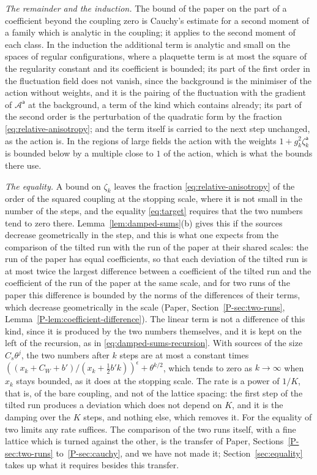 \documentclass[11pt]{preprint}
\numberwithin{equation}{section}
\theoremstyle{definition}
\theoremstyle{remark}
\theoremstyle{plain}
\begin{document}
\emph{The remainder and the induction.} The bound of the paper on the part of a coefficient beyond the coupling zero is Cauchy's estimate for a second moment of a family which is analytic in the coupling; it applies to the second moment of each class. In the induction the additional term is analytic and small on the spaces of regular configurations, where a plaquette term is at most the square of the regularity constant and its coefficient is bounded; its part of the first order in the fluctuation field does not vanish, since the background is the minimiser of the action without weights, and it is the pairing of the fluctuation with the gradient of $\mathcal A^{\mathsf a}$ at the background, a term of the kind which \cite[(1.5)]{BalabanRG1} contains already; its part of the second order is the perturbation of the quadratic form by the fraction \eqref{eq:relative-anisotropy}; and the term itself is carried to the next step unchanged, as the action is. In the regions of large fields the action with the weights $1 + g_k^2\zeta^{\mathsf a}_k$ is bounded below by a multiple close to $1$ of the action, which is what the bounds there use.

\emph{The equality.} A bound on $\zeta_k$ leaves the fraction \eqref{eq:relative-anisotropy} of the order of the squared coupling at the stopping scale, where it is not small in the number of the steps, and the equality \eqref{eq:target} requires that the two numbers tend to zero there. Lemma~\ref{lem:damped-sums}(b) gives this if the sources decrease geometrically in the step, and this is what one expects from the comparison of the tilted run with the run of the paper at their shared scales: the run of the paper has equal coefficients, so that each deviation of the tilted run is at most twice the largest difference between a coefficient of the tilted run and the coefficient of the run of the paper at the same scale, and for two runs of the paper this difference is bounded by the norms of the differences of their terms, which decrease geometrically in the scale (Paper, Section~\ref{P-sec:two-runs}, Lemma~\ref{P-lem:coefficient-difference}). The linear term is not a difference of this kind, since it is produced by the two numbers themselves, and it is kept on the left of the recursion, as in \eqref{eq:damped-sums-recursion}. With sources of the size $C_s\theta^j$, the two numbers after $k$ steps are at most a constant times $((x_k + C_W + b')/(x_k + \frac12b'k))^\epsilon + \theta^{k/2}$, which tends to zero as $k \to \infty$ when $x_k$ stays bounded, as it does at the stopping scale. The rate is a power of $1/K$, that is, of the bare coupling, and not of the lattice spacing: the first step of the tilted run produces a deviation which does not depend on $K$, and it is the damping over the $K$ steps, and nothing else, which removes it. For the equality of two limits any rate suffices. The comparison of the two runs itself, with a fine lattice which is turned against the other, is the transfer of Paper, Sections~\ref{P-sec:two-runs} to~\ref{P-sec:cauchy}, and we have not made it; Section~\ref{sec:equality} takes up what it requires besides this transfer.
\end{document}
